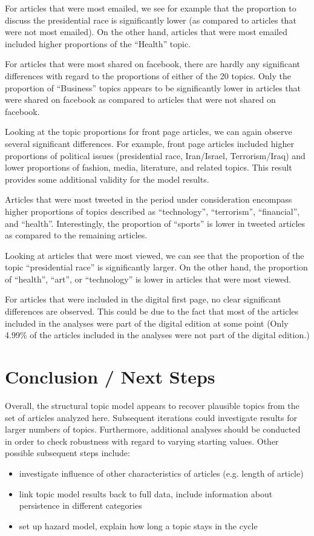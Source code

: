 \documentclass[12pt]{article}
\begin{document}
\begin{doublespace}
For articles that were most emailed, we see for example that the proportion to discuss the presidential race is significantly lower (as compared to articles that were not most emailed). On the other hand, articles that were most emailed included higher proportions of the ``Health'' topic.

\clearpage
For articles that were most shared on facebook, there are hardly any significant differences with regard to the proportions of either of the 20 topics. Only the proportion of ``Business'' topics appears to be significantly lower in articles that were shared on facebook as compared to articles that were not shared on facebook.

\clearpage
Looking at the topic proportions for front page articles, we can again observe several significant differences. For example, front page articles included higher proportions of political issues (presidential race, Iran/Israel, Terrorism/Iraq) and lower proportions of fashion, media, literature, and related topics. This result provides some additional validity for the model results.

\clearpage
Articles that were most tweeted in the period under consideration encompass higher proportions of topics described as ``technology'', ``terrorism'', ``financial'', and ``health''. Interestingly, the proportion of ``sports'' is lower in tweeted articles as compared to the remaining articles.

\clearpage
Looking at articles that were most viewed, we can see that the proportion of the topic ``presidential race'' is significantly larger. On the other hand, the proportion of ``health'', ``art'', or ``technology'' is lower in articles that were most viewed.

\clearpage
For articles that were included in the digital first page, no clear significant differences are observed. This could be due to the fact that most of the articles included in the analyses were part of the digital edition at some point (Only 4.99\% of the articles included in the analyses were not part of the digital edition.)

\clearpage
\section{Conclusion / Next Steps}
Overall, the structural topic model appears to recover plausible topics from the set of articles analyzed here. Subsequent iterations could investigate results for larger numbers of topics. Furthermore, additional analyses should be conducted in order to check robustness with regard to varying starting values. Other possible subsequent steps include:
\begin{itemize}
  \item investigate influence of other characteristics of articles (e.g. length of article)
  \item link topic model results back to full data, include information about persistence in different categories
  \item set up hazard model, explain how long a topic stays in the cycle
\end{itemize}



\end{doublespace}

\clearpage


\end{document}
